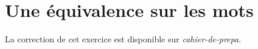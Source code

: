 \section{Une équivalence sur les mots}

La correction de cet exercice est disponible sur \textit{cahier-de-prepa}.
